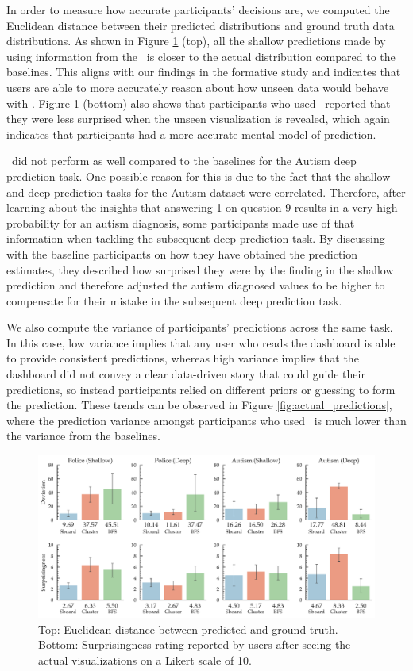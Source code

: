  In order to measure how accurate participants' decisions are, we computed the Euclidean distance between their predicted distributions and ground truth data distributions. As shown in Figure \ref{fig:distance} (top), all the shallow predictions made by using information from the \system\ is closer to the actual distribution compared to the baselines. This aligns with our findings in the formative study and indicates that users are able to more accurately reason about how unseen data would behave with \system. Figure \ref{fig:distance} (bottom) also shows that participants who used \system\ reported that they were less surprised when the unseen visualization is revealed, which again indicates that participants had a more accurate mental model of prediction.
\par \system\ did not perform as well compared to the baselines for the Autism deep prediction task. One possible reason for this is due to the fact that the shallow and deep prediction tasks for the Autism dataset were correlated. Therefore, after learning about the insights that answering 1 on question 9 results in a very high probability for an autism diagnosis, some participants made use of that information when tackling the subsequent deep prediction task. By discussing with the baseline participants on how they have obtained the prediction estimates, they described how surprised they were by the finding in the shallow prediction and therefore adjusted the autism diagnosed values to be higher to compensate for their mistake in the subsequent deep prediction task.
\par We also compute the variance of participants' predictions across the same task. In this case, low variance implies that any user who reads the dashboard is able to provide consistent predictions, whereas high variance implies that the dashboard did not convey a clear data-driven story that could guide their predictions, so instead participants relied on different priors or guessing to form the prediction. These trends can be observed in Figure \ref{fig:actual_predictions}, where the prediction variance amongst participants who used \system\ is much lower than the variance from the baselines.
\begin{figure}[bht]
\centering
\includegraphics[width=\linewidth]{figures/Devation_Surprisingness.pdf}
\caption{Top: Euclidean distance between predicted and ground truth. Bottom: Surprisingness rating reported by users after seeing the actual visualizations on a Likert scale of 10.}
\label{fig:distance}
\end{figure}
